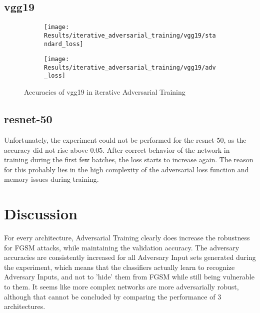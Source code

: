 \documentclass[draft,final]{vutinfth} %
\begin{document}
\FloatBarrier
\subsection{vgg19}

\begin{figure}[h]
  \begin{subfigure}[b]{0.5\columnwidth}
		\centering
    \texttt{[image: Results/iterative\_adversarial\_training/vgg19/standard\_loss]}
    \label{fig:exp:iat:alex:data}
  \end{subfigure}
  \begin{subfigure}[b]{0.5\columnwidth}
		\centering
    \texttt{[image: Results/iterative\_adversarial\_training/vgg19/adv\_loss]}
    \label{fig:exp:iat:alex:loss}
  \end{subfigure}
  \caption{Accuracies of vgg19 in iterative Adversarial Training}
\end{figure}

\FloatBarrier
\subsection{resnet-50}

Unfortunately, the experiment could not be performed for the resnet-50, as the accuracy did not rise above 0.05.
After correct behavior of the network in training during the first few batches, the loss starts to increase again.
The reason for this probably lies in the high complexity of the adversarial loss function and memory issues during training.

\section{Discussion}


For every architecture, Adversarial Training clearly does increase the robustness for FGSM attacks, while maintaining the validation accuracy.
The adversary accuracies are consistently increased for all Adversary Input sets generated during the experiment, which means that the classifiers actually learn to recognize
Adversary Inputs, and not to 'hide' them from FGSM while still being vulnerable to them.
It seems like more complex networks are more adversarially robust, although that cannot be concluded by comparing the performance of 3 architectures.\\
\end{document}
